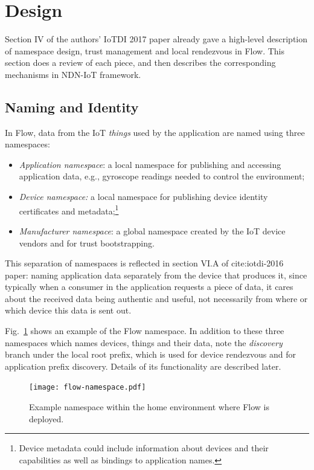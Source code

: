\section{Design}
\label{sec:design}

Section IV of the authors' IoTDI 2017 paper already gave a high-level description of namespace design, trust management and local rendezvous in Flow.
This section does a review of each piece, and then describes the corresponding mechanisms in NDN-IoT framework.

\subsection{Naming and Identity}
\label{sec:naming}

In Flow, data from the IoT \textit{things} used by the application are named using three namespaces:
\begin{itemize}
\item \emph{Application namespace}: a local namespace for publishing and accessing application data, e.g., gyroscope readings needed to control the environment; 
\item \emph{Device namespace:} a local namespace for publishing device identity certificates and metadata;\footnote{Device metadata could include information about devices and their capabilities as well as bindings to application names.}
\item \emph{Manufacturer namespace}: a global namespace created by the IoT device vendors and for trust bootstrapping.
\end{itemize}

This separation of namespaces is reflected in section VI.A of cite:iotdi-2016 paper: naming application data separately from the device that produces it, since typically when a consumer in the application requests a piece of data, it cares about the received data being authentic and useful, not necessarily from where or which device this data is sent out.

Fig.~\ref{fig:flow-namespace} shows an example of the Flow namespace.
In addition to these three namespaces which names devices, things and their data, note the \textit{discovery} branch under the local root prefix, which is used for device rendezvous and for application prefix discovery.
Details of its functionality are described later.

\begin{figure}[!t]
\centering
\texttt{[image: flow-namespace.pdf]}
\caption{Example namespace within the home environment where Flow is deployed.}
\label{fig:flow-namespace}
\end{figure}

